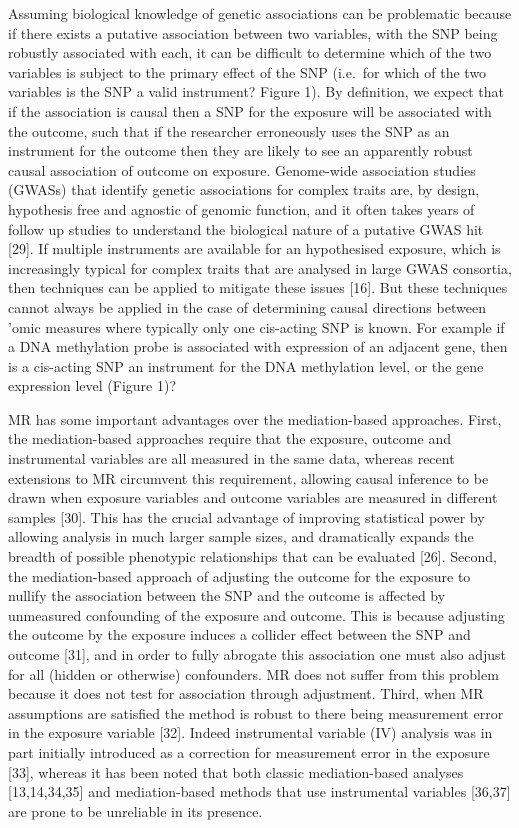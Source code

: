 \documentclass[]{article}
\begin{document}
Assuming biological knowledge of genetic associations can be problematic
because if there exists a putative association between two variables,
with the SNP being robustly associated with each, it can be difficult to
determine which of the two variables is subject to the primary effect of
the SNP (i.e.~for which of the two variables is the SNP a valid
instrument? Figure 1). By definition, we expect that if the association
is causal then a SNP for the exposure will be associated with the
outcome, such that if the researcher erroneously uses the SNP as an
instrument for the outcome then they are likely to see an apparently
robust causal association of outcome on exposure. Genome-wide
association studies (GWASs) that identify genetic associations for
complex traits are, by design, hypothesis free and agnostic of genomic
function, and it often takes years of follow up studies to understand
the biological nature of a putative GWAS hit {[}29{]}. If multiple
instruments are available for an hypothesised exposure, which is
increasingly typical for complex traits that are analysed in large GWAS
consortia, then techniques can be applied to mitigate these issues
{[}16{]}. But these techniques cannot always be applied in the case of
determining causal directions between 'omic measures where typically
only one cis-acting SNP is known. For example if a DNA methylation probe
is associated with expression of an adjacent gene, then is a cis-acting
SNP an instrument for the DNA methylation level, or the gene expression
level (Figure 1)?

MR has some important advantages over the mediation-based approaches.
First, the mediation-based approaches require that the exposure, outcome
and instrumental variables are all measured in the same data, whereas
recent extensions to MR circumvent this requirement, allowing causal
inference to be drawn when exposure variables and outcome variables are
measured in different samples {[}30{]}. This has the crucial advantage
of improving statistical power by allowing analysis in much larger
sample sizes, and dramatically expands the breadth of possible
phenotypic relationships that can be evaluated {[}26{]}. Second, the
mediation-based approach of adjusting the outcome for the exposure to
nullify the association between the SNP and the outcome is affected by
unmeasured confounding of the exposure and outcome. This is because
adjusting the outcome by the exposure induces a collider effect between
the SNP and outcome {[}31{]}, and in order to fully abrogate this
association one must also adjust for all (hidden or otherwise)
confounders. MR does not suffer from this problem because it does not
test for association through adjustment. Third, when MR assumptions are
satisfied the method is robust to there being measurement error in the
exposure variable {[}32{]}. Indeed instrumental variable (IV) analysis
was in part initially introduced as a correction for measurement error
in the exposure {[}33{]}, whereas it has been noted that both classic
mediation-based analyses {[}13,14,34,35{]} and mediation-based methods
that use instrumental variables {[}36,37{]} are prone to be unreliable
in its presence.
\end{document}

